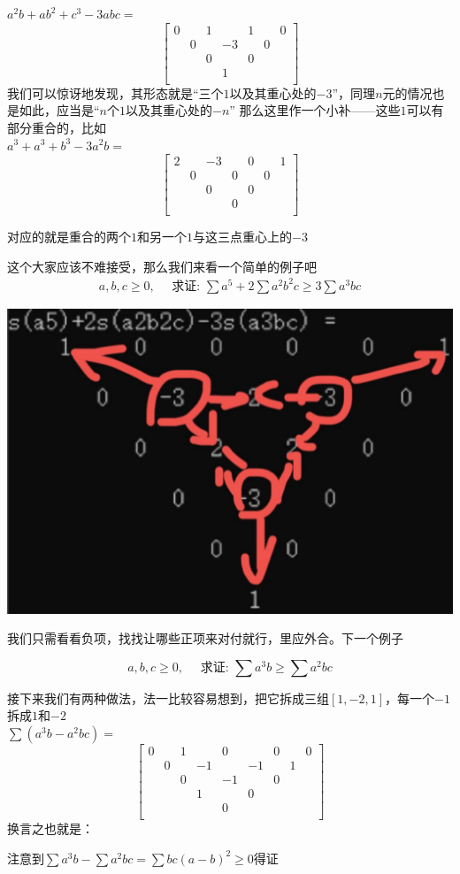 \documentclass[UTF8]{ctexart}
\begin{document}
$ a^{2}b+ab^{2}+c^{3}-3abc= $
\renewcommand*{\arraystretch}{1.732}\[\left[\begin{matrix}
	0& & 1& &1& & 0\\
	& 0& & -3& &0 &\\
	& & 0& &0& & \\
	& & & 1& & &\\
\end{matrix}\right]\]
我们可以惊讶地发现，其形态就是“三个$ 1 $以及其重心处的$ -3 $”，同理$ n $元的情况也是如此，应当是“$ n $个$ 1 $以及其重心处的$ -n $”
那么这里作一个小补——这些$ 1 $可以有部分重合的，比如\\
$ a^{3}+a^{3}+b^{3}-3a^{2}b= $
\renewcommand*{\arraystretch}{1.732}\[\left[\begin{matrix}
	2& & -3& &0& & 1\\
	& 0& & 0& &0 &\\
	& & 0& &0& & \\
	& & & 0& & &\\
\end{matrix}\right]\]

对应的就是重合的两个$ 1 $和另一个$ 1 $与这三点重心上的$ -3 $

这个大家应该不难接受，那么我们来看一个简单的例子吧
$$
\begin{gathered}
	a, b, c \geq 0, \quad \text { 求证: } \sum a^{5}+2 \sum a^{2} b^{2} c \geq 3 \sum a^{3} b c
\end{gathered}
$$
\begin{center}
	\includegraphics[width=0.4\linewidth]{120}
\end{center}

我们只需看看负项，找找让哪些正项来对付就行，里应外合。下一个例子

$$ a, b, c \geq 0, \quad \text { 求证: } \sum a^{3} b \geq \sum a^{2} b c
$$

接下来我们有两种做法，法一比较容易想到，把它拆成三组$ [1,-2,1] $，每一个$ -1 $拆成$ 1 $和$ -2 $\\
$ \displaystyle \sum (a^{3} b-a^{2} b c)= $
\renewcommand*{\arraystretch}{1.732}\[\left[\begin{matrix}
	0& &1& &0& &0& &0\\
	&0& &-1& &-1& &1&\\
	& &0& &-1& &0& &\\
	& & &1& &0& & &\\
	& & & &0& & & &\\
\end{matrix}\right]\]
换言之也就是：\\
\begin{center}
	注意到$ \displaystyle \sum a^{3} b-\displaystyle \sum a^{2} b c=\displaystyle \sum b c(a-b)^{2} \geq 0 $得证
\end{center}
\end{document}
